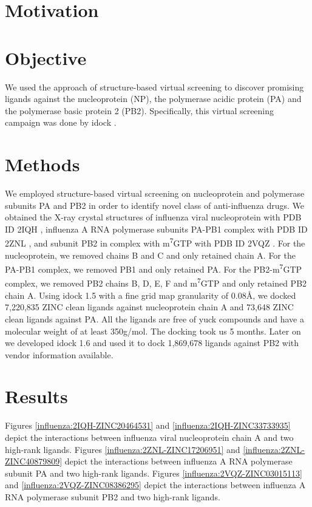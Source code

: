 \section{Motivation}



\section{Objective}

We used the approach of structure-based virtual screening to discover promising ligands against the nucleoprotein (NP), the polymerase acidic protein (PA) and the polymerase basic protein 2 (PB2). Specifically, this virtual screening campaign was done by idock \citep{1153}.

\section{Methods}

We employed structure-based virtual screening on nucleoprotein and polymerase subunits PA and PB2 in order to identify novel class of anti-influenza drugs. We obtained the X-ray crystal structures of influenza viral nucleoprotein with PDB ID 2IQH \citep{1140}, influenza A RNA polymerase subunits PA-PB1 complex with PDB ID 2ZNL \citep{1141}, and subunit PB2 in complex with m\textsuperscript{7}GTP with PDB ID 2VQZ \citep{1192}. For the nucleoprotein, we removed chains B and C and only retained chain A. For the PA-PB1 complex, we removed PB1 and only retained PA. For the PB2-m\textsuperscript{7}GTP complex, we removed PB2 chains B, D, E, F and m\textsuperscript{7}GTP and only retained PB2 chain A. Using idock 1.5 with a fine grid map granularity of 0.08\AA, we docked 7,220,835 ZINC \citep{532} clean ligands against nucleoprotein chain A and 73,648 ZINC clean ligands against PA. All the ligands are free of yuck compounds and have a molecular weight of at least 350g/mol. The docking took us 5 months. Later on we developed idock 1.6 and used it to dock 1,869,678 ligands against PB2 with vendor information available.

\section{Results}

Figures \ref{influenza:2IQH-ZINC20464531} and \ref{influenza:2IQH-ZINC33733935} depict the interactions between influenza viral nucleoprotein chain A and two high-rank ligands. Figures \ref{influenza:2ZNL-ZINC17206951} and \ref{influenza:2ZNL-ZINC40879809} depict the interactions between influenza A RNA polymerase subunit PA and two high-rank ligands. Figures \ref{influenza:2VQZ-ZINC03015113} and \ref{influenza:2VQZ-ZINC08386295} depict the interactions between influenza A RNA polymerase subunit PB2 and two high-rank ligands.

